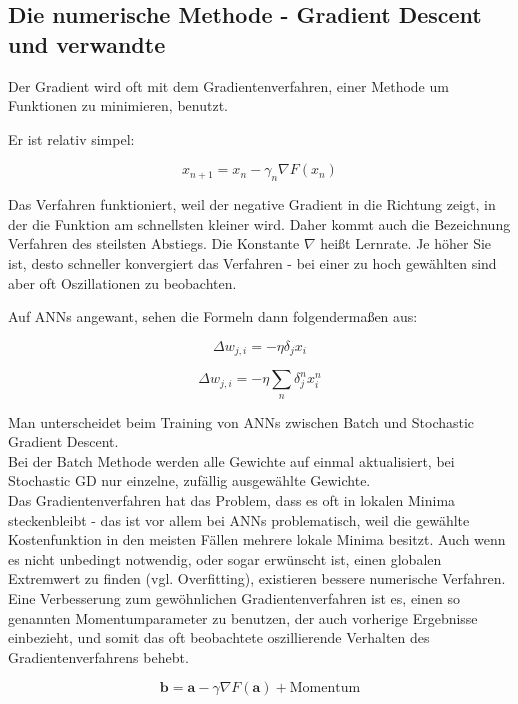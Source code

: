 \subsection{Die numerische Methode - Gradient Descent und verwandte}

Der Gradient wird oft mit dem Gradientenverfahren, einer Methode um Funktionen zu minimieren, benutzt.

Er ist relativ simpel:

\begin{equation}
x_{n+1}=x_n-\gamma_n \nabla F(x_n)
\end{equation}

Das Verfahren funktioniert, weil der negative Gradient in die Richtung zeigt, in der die Funktion am schnellsten kleiner wird. Daher kommt auch die Bezeichnung Verfahren des steilsten Abstiegs.
Die Konstante $\nabla$ heißt Lernrate. Je höher Sie ist, desto schneller konvergiert das Verfahren - bei einer zu hoch gewählten sind aber oft Oszillationen zu beobachten. 

Auf ANNs angewant, sehen die Formeln dann folgendermaßen aus:

\begin{equation}
\Delta w_{j,i} = - \eta  \delta_j  x_i 
\end{equation}

\begin{equation}
\Delta w_{j,i} = - \eta  \sum_n \delta_j^n  x_i^n 
\end{equation}

\cite{bishop1995neural} 

Man unterscheidet beim Training von ANNs zwischen Batch und Stochastic Gradient Descent.\\

Bei der Batch Methode werden alle Gewichte auf einmal aktualisiert, bei Stochastic GD nur einzelne, zufällig ausgewählte Gewichte.\\

Das Gradientenverfahren hat das Problem, dass es oft in lokalen Minima steckenbleibt - das ist vor allem bei ANNs problematisch, weil die gewählte Kostenfunktion in den meisten Fällen mehrere lokale Minima besitzt. Auch wenn es nicht unbedingt notwendig, oder sogar erwünscht ist, einen globalen Extremwert zu finden (vgl. Overfitting), existieren bessere numerische Verfahren. \\

Eine Verbesserung zum gewöhnlichen Gradientenverfahren ist es, einen so genannten Momentumparameter zu benutzen, der auch vorherige Ergebnisse einbezieht, und somit das oft beobachtete oszillierende Verhalten des Gradientenverfahrens behebt.

\begin{equation}
 \mathbf{b} = \mathbf{a}-\gamma\nabla F(\mathbf{a}) + \text{Momentum}
\end{equation}